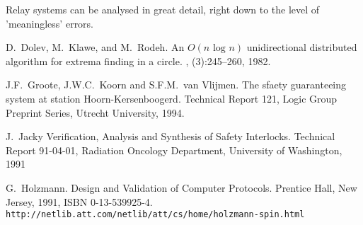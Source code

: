 Relay systems can be analysed in great detail, right down to the level of 'meaningless'
errors.


\begin{thebibliography}{10}


D.~Dolev, M.~Klawe, and M.~Rodeh.
\newblock An {$O(\mbox{$n$ log $n$})$} unidirectional distributed
algorithm for
  extrema finding in a circle.
, (3):245--260, 1982.

J.F.~Groote, J.W.C.~Koorn and S.F.M.~van Vlijmen.
\newblock The sfaety guaranteeing system at station {Hoorn-Kersenboogerd}.
\newblock Technical Report 121, Logic Group Preprint Series, Utrecht University, 1994.


J.~Jacky
\newblock Verification, Analysis and Synthesis of Safety Interlocks.
\newblock Technical Report 91-04-01, Radiation Oncology Department, University of Washington,
1991

G.~Holzmann.
Design and Validation of Computer Protocols.
Prentice Hall, New Jersey, 1991, ISBN 0-13-539925-4. 
\\
{\tt http://netlib.att.com/netlib/att/cs/home/holzmann-spin.html}
\end{thebibliography}



